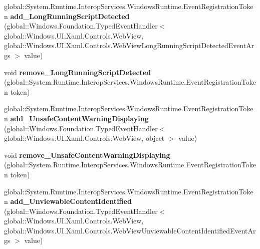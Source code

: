\begin{DoxyCompactItemize}
\item 
\mbox{\label{interface_windows_1_1_u_i_1_1_xaml_1_1_controls_1_1_i_web_view2_a2b49e3ea316c527b6e25017b9cf4bee5}} 
global\+::\+System.\+Runtime.\+Interop\+Services.\+Windows\+Runtime.\+Event\+Registration\+Token {\bfseries add\+\_\+\+Long\+Running\+Script\+Detected} (global\+::\+Windows.\+Foundation.\+Typed\+Event\+Handler$<$ global\+::\+Windows.\+U\+I.\+Xaml.\+Controls.\+Web\+View, global\+::\+Windows.\+U\+I.\+Xaml.\+Controls.\+Web\+View\+Long\+Running\+Script\+Detected\+Event\+Args $>$ value)
\item 
\mbox{\label{interface_windows_1_1_u_i_1_1_xaml_1_1_controls_1_1_i_web_view2_af037b1883abb030235ed2cf192337825}} 
void {\bfseries remove\+\_\+\+Long\+Running\+Script\+Detected} (global\+::\+System.\+Runtime.\+Interop\+Services.\+Windows\+Runtime.\+Event\+Registration\+Token token)
\item 
\mbox{\label{interface_windows_1_1_u_i_1_1_xaml_1_1_controls_1_1_i_web_view2_acdcabb7c71e53867b288d8758f233b6e}} 
global\+::\+System.\+Runtime.\+Interop\+Services.\+Windows\+Runtime.\+Event\+Registration\+Token {\bfseries add\+\_\+\+Unsafe\+Content\+Warning\+Displaying} (global\+::\+Windows.\+Foundation.\+Typed\+Event\+Handler$<$ global\+::\+Windows.\+U\+I.\+Xaml.\+Controls.\+Web\+View, object $>$ value)
\item 
\mbox{\label{interface_windows_1_1_u_i_1_1_xaml_1_1_controls_1_1_i_web_view2_a3eb3a06e24cf2bd12de883bf81fb40d7}} 
void {\bfseries remove\+\_\+\+Unsafe\+Content\+Warning\+Displaying} (global\+::\+System.\+Runtime.\+Interop\+Services.\+Windows\+Runtime.\+Event\+Registration\+Token token)
\item 
\mbox{\label{interface_windows_1_1_u_i_1_1_xaml_1_1_controls_1_1_i_web_view2_a638c2029f3df84d7780aad5ec3492315}} 
global\+::\+System.\+Runtime.\+Interop\+Services.\+Windows\+Runtime.\+Event\+Registration\+Token {\bfseries add\+\_\+\+Unviewable\+Content\+Identified} (global\+::\+Windows.\+Foundation.\+Typed\+Event\+Handler$<$ global\+::\+Windows.\+U\+I.\+Xaml.\+Controls.\+Web\+View, global\+::\+Windows.\+U\+I.\+Xaml.\+Controls.\+Web\+View\+Unviewable\+Content\+Identified\+Event\+Args $>$ value)

\end{DoxyCompactItemize}
